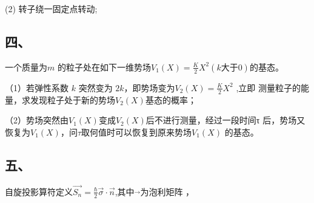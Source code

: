 (2) 转子绕一固定点转动;
\subsection{四、}
一个质量为$m$ 的粒子处在如下一维势场$V_1(X) = \frac{K}{2}X^2(k \text{大于} 0)$的基态。

（1）若弹性系数 $k$ 突然变为 $2k$，即势场变为$V_2(X) = \frac{K}{2}X^2$ ,立即
测量粒子的能量，求发现粒子处于新的势场$V_2(X)$基态的概率；

（2）势场突然由$V_1(X)$变成$V_2(X)$后不进行测量，经过一段时间τ
后，势场又恢复为$V_1(X)$，问$\tau$取何值时可以恢复到原来势场$V_1(X)$
的基态。
\subsection{五、}
自旋投影算符定义$\vec{S_n}=\frac{\hbar}{2}\vec{\sigma}\cdot \vec{n}$,其中$\vec{}$为泡利矩阵 ，